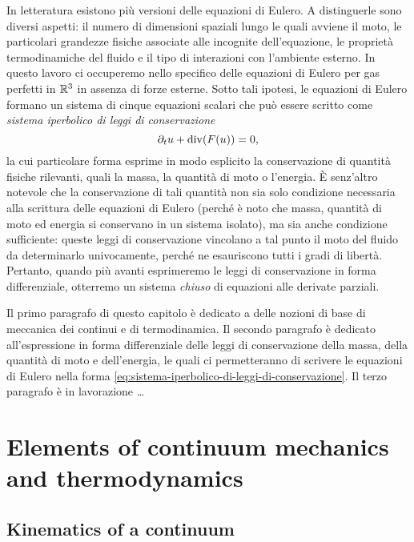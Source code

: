 In letteratura esistono più versioni delle equazioni di Eulero.
A distinguerle sono diversi aspetti:
il numero di dimensioni spaziali lungo le quali avviene il moto,
le particolari grandezze fisiche associate alle incognite dell'equazione,
le proprietà termodinamiche del fluido
e il tipo di interazioni con l'ambiente esterno.
In questo lavoro ci occuperemo nello specifico delle
equazioni di Eulero per gas perfetti in $\mathbb{R}^3$ in assenza di forze esterne.
Sotto tali ipotesi, le equazioni di Eulero formano un sistema di
cinque equazioni scalari che può essere scritto come
\emph{sistema iperbolico di leggi di conservazione}
\begin{equation} \label{eq:sistema-iperbolico-di-leggi-di-conservazione}
\partial_t u + \operatorname{div}(F(u)) = 0,
\end{equation}
la cui particolare forma esprime in modo esplicito
la conservazione di quantità fisiche rilevanti,
quali la massa, la quantità di moto o l'energia.
È senz'altro notevole che la conservazione di tali quantità
non sia solo condizione necessaria alla scrittura delle equazioni
di Eulero (perché è noto che massa, quantità di moto
ed energia si conservano in un sistema isolato),
ma sia anche condizione sufficiente: queste leggi
di conservazione vincolano a tal punto il moto del fluido
da determinarlo univocamente, perché ne esauriscono tutti i gradi
di libertà.
Pertanto, quando più avanti esprimeremo le leggi di conservazione
in forma differenziale, otterremo un sistema \emph{chiuso} di equazioni
alle derivate parziali.

Il primo paragrafo di questo capitolo è dedicato a delle nozioni di base
di meccanica dei continui e di termodinamica.
Il secondo paragrafo è dedicato all'espressione in forma differenziale
delle leggi di conservazione della massa, della quantità di moto e
dell'energia, le quali ci permetteranno di scrivere le equazioni di Eulero
nella forma \eqref{eq:sistema-iperbolico-di-leggi-di-conservazione}.
Il terzo paragrafo è in lavorazione \dots

\section{Elements of continuum mechanics and thermodynamics}

\subsection*{Kinematics of a continuum}

